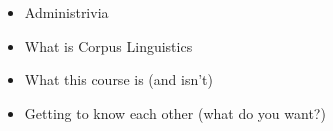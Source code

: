 \documentclass[a4paper,landscape,headrule,footrule,xetex]{foils}
\begin{document}
\maketitle



\begin{itemize}
\item Administrivia
\item What is Corpus Linguistics
\item What this course is (and isn't)
\item Getting to know each other (what do you want?)
\end{itemize}



\end{document}

